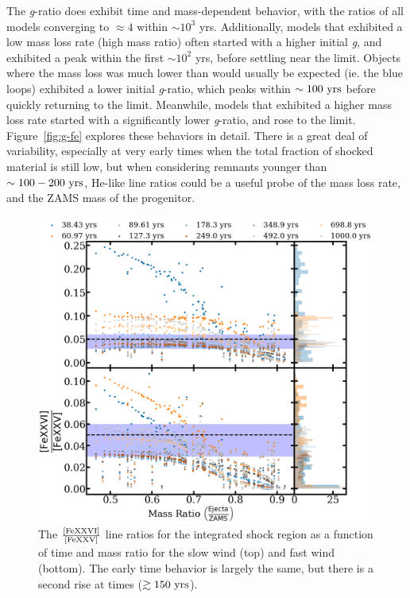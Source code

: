 \documentclass[twocolumn]{aastex631}
\begin{document}
The \textit{g}-ratio does exhibit time and mass-dependent behavior, with the ratios of all models converging to $\approx 4$ within $\sim 10^3$ yrs. Additionally, models that exhibited a low mass loss rate (high mass ratio) often started with a higher initial \textit{g}, and exhibited a peak within the first $\sim10^2$ yrs, before settling near the limit. Objects where the mass loss was much lower than would usually be expected (ie. the blue loops) exhibited a lower initial \textit{g}-ratio, which peaks within $\sim 100~\rm yrs$ before quickly returning to the limit. Meanwhile, models that exhibited a higher mass loss rate started with a significantly lower \textit{g}-ratio, and rose to the limit. Figure~\ref{fig:g-fe} explores these behaviors in detail. There is a great deal of variability, especially at very early times when the total fraction of shocked material is still low, but when considering remnants younger than $\sim 100-200~\rm yrs$, He-like line ratios could be a useful probe of the mass loss rate, and the ZAMS mass of the progenitor. %

\begin{figure}[htb]
    \centering
    \includegraphics[scale=0.16]{intshockhhe.png}
    \caption{The $\frac{\rm \left[FeXXVI\right]}{\rm \left[FeXXV\right]}$ line ratios for the integrated shock region as a function of time and mass ratio for the slow wind (top) and fast wind (bottom). The early time behavior is largely the same, but there is a second rise at times ($\gtrsim 150~\rm yrs$).}
    \label{fig:int-shock-fe}
\end{figure}
\end{document}
